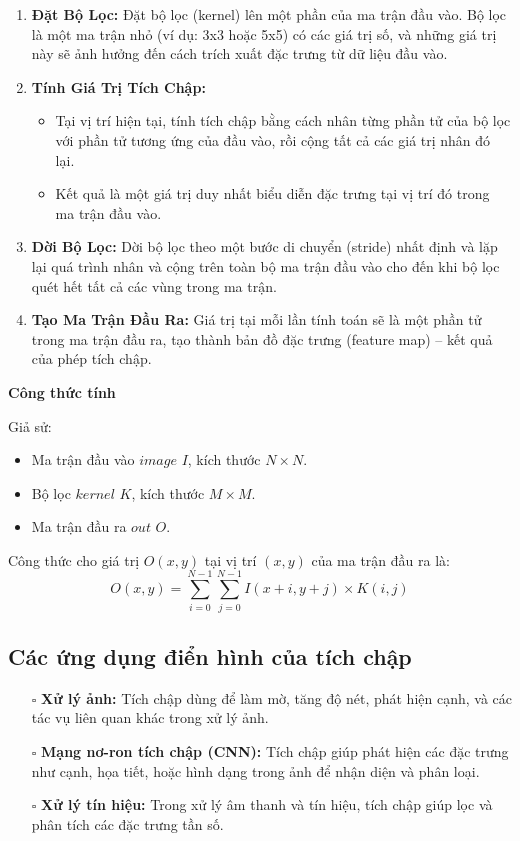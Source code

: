\documentclass{article}
\begin{document}
\begin{enumerate}
	\item \textbf{Đặt Bộ Lọc:} Đặt bộ lọc (kernel) lên một phần của ma trận đầu vào. Bộ lọc là một ma trận nhỏ (ví dụ: 3x3 hoặc 5x5) có các giá trị số, và những giá trị này sẽ ảnh hưởng đến cách trích xuất đặc trưng từ dữ liệu đầu vào.
	\item \textbf{Tính Giá Trị Tích Chập:}
	\begin{itemize}
		\item Tại vị trí hiện tại, tính tích chập bằng cách nhân từng phần tử của bộ lọc với phần tử tương ứng của đầu vào, rồi cộng tất cả các giá trị nhân đó lại.
		\item Kết quả là một giá trị duy nhất biểu diễn đặc trưng tại vị trí đó trong ma trận đầu vào.
	\end{itemize}
	\item \textbf{Dời Bộ Lọc:} Dời bộ lọc theo một bước di chuyển (stride) nhất định và lặp lại quá trình nhân và cộng trên toàn bộ ma trận đầu vào cho đến khi bộ lọc quét hết tất cả các vùng trong ma trận.
	\item \textbf{Tạo Ma Trận Đầu Ra:} Giá trị tại mỗi lần tính toán sẽ là một phần tử trong ma trận đầu ra, tạo thành bản đồ đặc trưng (feature map) – kết quả của phép tích chập.
\end{enumerate}

\begin{flushleft}
	\fontsize{14pt}{1pt} \selectfont \textbf{Công thức tính}
\end{flushleft}

Giả sử:

\begin{itemize}
	\item Ma trận đầu vào $image$ $I$, kích thước $N \times N$.
	\item Bộ lọc $kernel$ $K$, kích thước $M \times M$.
	\item Ma trận đầu ra $out$ $O$.
\end{itemize}

Công thức cho giá trị $O(x, y)$ tại vị trí $(x,y)$ của ma trận đầu ra là:
\begin{equation*}
	O(x, y) = \sum_{i=0}^{N-1} \sum_{j=0}^{N-1} I(x+i, y+j) \times K(i, j)
\end{equation*}

\subsection{Các ứng dụng điển hình của tích chập}
\begin{itemize}
	\item[$\square$] \textbf{Xử lý ảnh:} Tích chập dùng để làm mờ, tăng độ nét, phát hiện cạnh, và các tác vụ liên quan khác trong xử lý ảnh.
	\item[$\square$] \textbf{Mạng nơ-ron tích chập (CNN):} Tích chập giúp phát hiện các đặc trưng như cạnh, họa tiết, hoặc hình dạng trong ảnh để nhận diện và phân loại.
	\item[$\square$] \textbf{Xử lý tín hiệu:} Trong xử lý âm thanh và tín hiệu, tích chập giúp lọc và phân tích các đặc trưng tần số.
\end{itemize}
\end{document}
